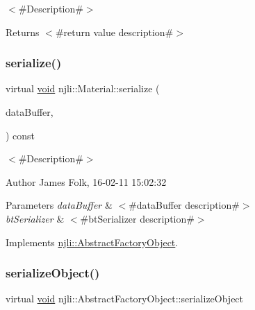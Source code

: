 $<$\#\+Description\#$>$

\begin{DoxyReturn}{Returns}
$<$\#return value description\#$>$ 
\end{DoxyReturn}
\mbox{\label{classnjli_1_1_material_a3ab82dce5ced09f9caaf974e24088aa2}} 
\subsubsection{\texorpdfstring{serialize()}{serialize()}}
{\footnotesize\ttfamily virtual \mbox{\hyperlink{_thread_8h_af1e856da2e658414cb2456cb6f7ebc66}{void}} njli\+::\+Material\+::serialize (\begin{DoxyParamCaption}\item[{\mbox{\hyperlink{_thread_8h_af1e856da2e658414cb2456cb6f7ebc66}{void}} $\ast$}]{data\+Buffer,  }\item[{bt\+Serializer $\ast$}]{ }\end{DoxyParamCaption}) const\hspace{0.3cm}{\ttfamily [virtual]}}



$<$\#\+Description\#$>$ 

\begin{DoxyAuthor}{Author}
James Folk, 16-\/02-\/11 15\+:02\+:32
\end{DoxyAuthor}

\begin{DoxyParams}{Parameters}
{\em data\+Buffer} & $<$\#data\+Buffer description\#$>$ \\
\hline
{\em bt\+Serializer} & $<$\#bt\+Serializer description\#$>$ \\
\hline
\end{DoxyParams}


Implements \mbox{\hyperlink{classnjli_1_1_abstract_factory_object_aad2fbe86fb3bdecf02918a96b9c57976}{njli\+::\+Abstract\+Factory\+Object}}.

\mbox{\label{classnjli_1_1_material_a4fc4bcd9d1930911474210c047372fc0}} 
\subsubsection{\texorpdfstring{serialize\+Object()}{serializeObject()}}
{\footnotesize\ttfamily virtual \mbox{\hyperlink{_thread_8h_af1e856da2e658414cb2456cb6f7ebc66}{void}} njli\+::\+Abstract\+Factory\+Object\+::serialize\+Object}

